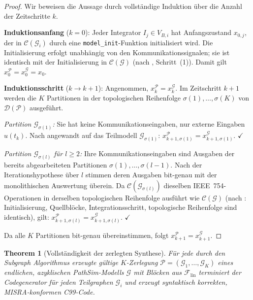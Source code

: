 ﻿\documentclass[12pt,a4paper]{article}
\newtheorem{theorem}{Theorem}[section]
\theoremstyle{definition}
\begin{document}
\begin{proof}
Wir beweisen die Aussage durch vollständige Induktion über die Anzahl
der Zeitschritte $k$.

\medskip
\textbf{Induktionsanfang} ($k = 0$):
Jeder Integrator $I_j \in V_{B,i}$ hat Anfangszustand $x_{0,j}$, der
in $\mathcal{C}(\mathcal{G}_i)$ durch eine \texttt{model\_init}-Funktion
initialisiert wird. Die Initialisierung erfolgt unabhängig von den
Kommunikationssignalen; sie ist identisch mit der Initialisierung in
$\mathcal{C}(\mathcal{G})$ (nach , Schritt~(1)).
Damit gilt $x_0^{\mathcal{P}} = x_0^{\mathcal{G}} = x_0$.

\medskip
\textbf{Induktionsschritt} ($k \to k+1$):
Angenommen, $x_k^{\mathcal{P}} = x_k^{\mathcal{G}}$.
Im Zeitschritt $k+1$ werden die $K$ Partitionen in der topologischen
Reihenfolge $\sigma(1), \ldots, \sigma(K)$ von $\mathcal{D}(\mathcal{P})$
ausgeführt.

\emph{Partition $\mathcal{G}_{\sigma(1)}$:}
Sie hat keine Kommunikationseingaben, nur externe Eingaben $u(t_k)$.
Nach  angewandt auf das Teilmodell $\mathcal{G}_{\sigma(1)}$:
$x_{k+1,\sigma(1)}^{\mathcal{P}} = x_{k+1,\sigma(1)}^{\mathcal{G}}$.
$\checkmark$

\emph{Partition $\mathcal{G}_{\sigma(l)}$ für $l \geq 2$:}
Ihre Kommunikationseingaben sind Ausgaben der bereits abgearbeiteten
Partitionen $\sigma(1), \ldots, \sigma(l-1)$. Nach der Iterationshypothese
über $l$ stimmen deren Ausgaben bit-genau mit der monolithischen Auswertung
überein. Da $\mathcal{C}(\mathcal{G}_{\sigma(l)})$ dieselben IEEE~754-Operationen
in derselben topologischen Reihenfolge ausführt wie $\mathcal{C}(\mathcal{G})$
(nach : Initialisierung, Quellblöcke, Integrationsschritt,
topologische Reihenfolge sind identisch), gilt:
$x_{k+1,\sigma(l)}^{\mathcal{P}} = x_{k+1,\sigma(l)}^{\mathcal{G}}$.
$\checkmark$

Da alle $K$ Partitionen bit-genau übereinstimmen, folgt
$x_{k+1}^{\mathcal{P}} = x_{k+1}^{\mathcal{G}}$.
\end{proof}

\begin{theorem}[Vollständigkeit der zerlegten Synthese]
\label{thm:comp-complete}
Für jede durch den Subgraph Algorithmus erzeugte gültige $K$-Zerlegung
$\mathcal{P} = (\mathcal{G}_1, \ldots, \mathcal{G}_K)$ eines endlichen,
azyklischen PathSim-Modells $\mathcal{G}$ mit Blöcken aus
$\mathcal{F}_{\mathrm{lin}}$ terminiert der Codegenerator für jeden
Teilgraphen $\mathcal{G}_i$ und erzeugt syntaktisch korrekten,
MISRA-konformen C99-Code.
\end{theorem}
\end{document}
